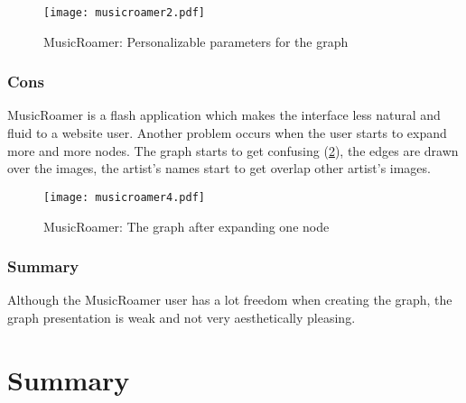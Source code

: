       \begin{figure}[H]
        \begin{center}
          \texttt{[image: musicroamer2.pdf]}
        \end{center}
        \caption{MusicRoamer: Personalizable parameters for the graph }
        \label{fig:sota_musicroamer3}
      \end{figure}


    \subsubsection{Cons} %
    \label{ssub:cons}

      MusicRoamer is a flash application which makes the interface less natural and fluid to a website user.
      Another problem occurs when the user starts to expand more and more nodes.
      The graph starts to get confusing (\ref{fig:sota_musicroamer4}), the edges are drawn over the images, the artist's names start to get overlap other artist's images.

      \begin{figure}
        \begin{center}
          \texttt{[image: musicroamer4.pdf]}
        \end{center}
        \caption{MusicRoamer: The graph after expanding one node}
        \label{fig:sota_musicroamer4}
      \end{figure}


    \subsubsection{Summary} %
    \label{ssub:summary}

      Although the MusicRoamer user has a lot freedom when creating the graph, the graph presentation is weak and not very aesthetically pleasing.



  \clearpage




\section{Summary}

